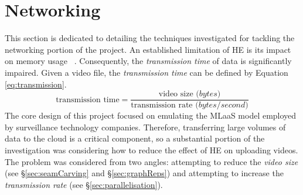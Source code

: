\setlength{\leftskip}{0cm}



\section{Networking}
\label{sec:networking}
\setlength{\leftskip}{0.25cm}
\indent \indent
This section is dedicated to detailing the techniques investigated for tackling the networking portion of the project. An established limitation of HE is its impact on memory usage ~\cite{Makkaoui}. Consequently, the \textit{transmission time} of data is significantly impaired. Given a video file, the \textit{transmission time} can be defined by Equation \ref{eq:transmission}.
\begin{equation}
    \text{transmission time} = \frac{\text{video size }\textit{(bytes)}}{\text{transmission rate }\textit{(bytes/second)}}
    \label{eq:transmission}
\end{equation}
\indent \indent
The core design of this project focused on emulating the MLaaS model employed by surveillance technology companies. Therefore, transferring large volumes of data to the cloud is a critical component, so a substantial portion of the investigation was considering how to reduce the effect of HE on uploading videos. The problem was considered from two angles: attempting to reduce the \textit{video size} (see §\ref{sec:seamCarving} and §\ref{sec:graphReps}) and attempting to increase the \textit{transmission rate} (see §\ref{sec:parallelisation}).

\setlength{\leftskip}{0cm}

